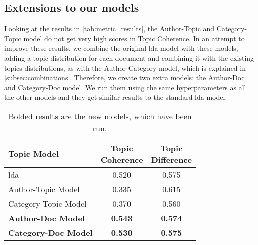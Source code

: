 \subsection{Extensions to our models}\label{subsec:app_exten_models}
Looking at the results in \autoref{tab:metric_results}, the Author-Topic and Category-Topic model do not get very high scores in Topic Coherence.
In an attempt to improve these results, we combine the original \gls{lda} model with these models, adding a topic distribution for each document and combining it with the existing topics distributions, as with the Author-Category model, which is explained in \autoref{subsec:combinations}.
Therefore, we create two extra models: the Author-Doc and Category-Doc model.
We run them using the same hyperparameters as all the other models and they get similar results to the standard \gls{lda} model.

\begin{table}[h]
	\centering
	\caption{Bolded results are the new models, which have been run.}
	\begin{tabular}{l|c|c}
		Topic Model & \makecell{Topic \\ Coherence} & \makecell{Topic \\ Difference} \\
		\midrule
		\Acrlong{lda} & 0.520 & 0.575 \\
		Author-Topic Model & 0.335 & 0.615 \\
		Category-Topic Model & 0.370 & 0.560 \\
		\textbf{Author-Doc Model} & \textbf{0.543} & \textbf{0.574} \\
		\textbf{Category-Doc Model} &\textbf{ 0.530} & \textbf{0.575} \\
	\end{tabular}
	\label{tab:_extra_metric_results}
\end{table}

